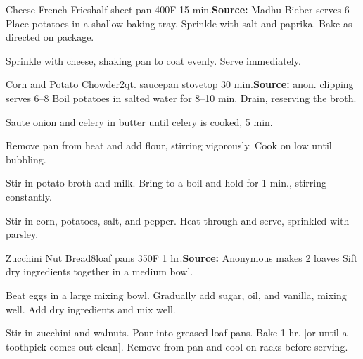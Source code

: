\begin{recipe}{Cheese French Fries}{half-sheet pan \hfill 400\0F \hfill 15 min.}{\textbf{Source:} Madhu Bieber \hfill serves 6}
 Place potatoes in a shallow baking tray. Sprinkle with salt and paprika. Bake as directed on package.

 Sprinkle with cheese, shaking pan to coat evenly. Serve immediately.
\end{recipe}

\begin{recipe}{Corn and Potato Chowder}{2qt. saucepan \hfill stovetop \hfill 30 min.}{\textbf{Source:} anon. clipping \hfill serves 6--8}
 Boil potatoes in salted water for 8--10 min. Drain, reserving the broth.

 Saute onion and celery in butter until celery is cooked, 5 min.

 Remove pan from heat and add flour, stirring vigorously. Cook on low until bubbling.

 Stir in potato broth and milk. Bring to a boil and hold for 1 min., stirring constantly.

 Stir in corn, potatoes, salt, and pepper. Heat through and serve, sprinkled with parsley.
\end{recipe}

\begin{recipe}{Zucchini Nut Bread}{8\inch{}\inch loaf pans \hfill 350\0F \hfill 1 hr.}{\textbf{Source:} Anonymous \hfill makes 2 loaves}
 Sift dry ingredients together in a medium bowl.

 Beat eggs in a large mixing bowl. Gradually add sugar, oil, and vanilla, mixing well. Add dry ingredients and mix well.

 Stir in zucchini and walnuts. Pour into greased loaf pans. Bake 1 hr. [or until a toothpick comes out clean]. Remove from pan and cool on racks before serving.
\end{recipe}

